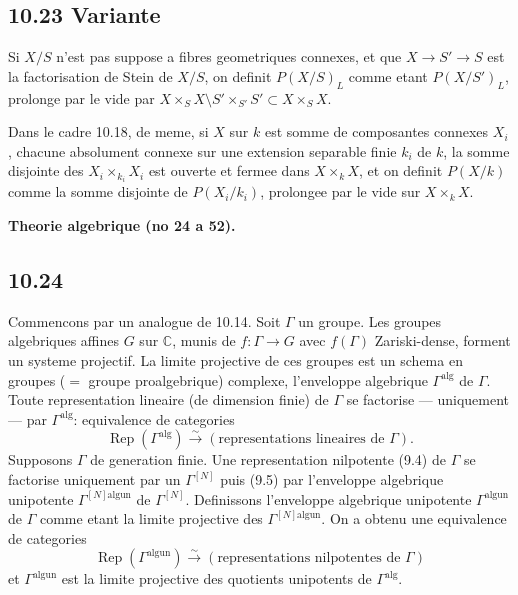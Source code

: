 \documentclass[12pt,a4paper]{article}
\theoremstyle{plain}
\theoremstyle{definition}
\theoremstyle{remark}
\DeclareMathOperator{\Rep}{Rep}
\newcommand{\C}{\mathbb{C}}
\newcommand{\alg}{\mathrm{alg}}
\newcommand{\un}{\mathrm{un}}
\begin{document}
\subsection*{10.23 Variante}

Si $X/S$ n'est pas suppose a fibres geometriques connexes, et que $X \to S' \to S$ est la factorisation de Stein de $X/S$, on definit $P(X/S)_L$ comme etant $P(X/S')_L$, prolonge par le vide par $X \times_S X \setminus S' \times_{S'} S' \subset X \times_S X$.

Dans le cadre 10.18, de meme, si $X$ sur $k$ est somme de composantes connexes $X_i$, chacune absolument connexe sur une extension separable finie $k_i$ de $k$, la somme disjointe des $X_i \times_{k_i} X_i$ est ouverte et fermee dans $X \times_k X$, et on definit $P(X/k)$ comme la somme disjointe de $P(X_i/k_i)$, prolongee par le vide sur $X \times_k X$.

\textbf{Theorie algebrique (no 24 a 52).}

\subsection*{10.24}

Commencons par un analogue de 10.14. Soit $\Gamma$ un groupe. Les groupes algebriques affines $G$ sur $\C$, munis de $f: \Gamma \to G$ avec $f(\Gamma)$ Zariski-dense, forment un systeme projectif. La limite projective de ces groupes est un schema en groupes ($=$ groupe proalgebrique) complexe, l'enveloppe algebrique $\Gamma^{\alg}$ de $\Gamma$. Toute representation lineaire (de dimension finie) de $\Gamma$ se factorise --- uniquement --- par $\Gamma^{\alg}$: equivalence de categories
\begin{equation}\label{10.24.1}
\Rep(\Gamma^{\alg}) \xrightarrow{\sim} (\text{representations lineaires de } \Gamma). \tag{10.24.1}
\end{equation}
Supposons $\Gamma$ de generation finie. Une representation nilpotente (9.4) de $\Gamma$ se factorise uniquement par un $\Gamma^{[N]}$ puis (9.5) par l'enveloppe algebrique unipotente $\Gamma^{[N] \alg \un}$ de $\Gamma^{[N]}$. Definissons l'enveloppe algebrique unipotente $\Gamma^{\alg \un}$ de $\Gamma$ comme etant la limite projective des $\Gamma^{[N] \alg \un}$. On a obtenu une equivalence de categories
\begin{equation}\label{10.24.2}
\Rep(\Gamma^{\alg \un}) \xrightarrow{\sim} (\text{representations nilpotentes de } \Gamma) \tag{10.24.2}
\end{equation}
et $\Gamma^{\alg \un}$ est la limite projective des quotients unipotents de $\Gamma^{\alg}$.
\end{document}
